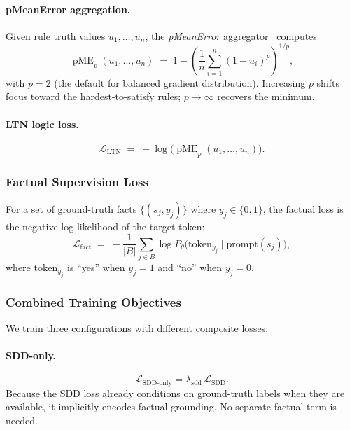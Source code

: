 \documentclass[11pt,a4paper]{article}
\newcommand{\pME}{\operatorname{pME}}
\newcommand{\SL}{\mathcal{L}_{\text{SDD}}}
\newcommand{\LTNloss}{\mathcal{L}_{\text{LTN}}}
\newcommand{\Lfact}{\mathcal{L}_{\text{fact}}}
\begin{document}
\paragraph{pMeanError aggregation.}
Given rule truth values $u_1, \dots, u_n$, the \emph{pMeanError}
aggregator~\cite{badreddine2022ltn} computes
\begin{equation}\label{eq:pme}
  \pME_p(u_1, \dots, u_n)
  \;=\; 1 - \left(
    \frac{1}{n}\sum_{i=1}^{n}(1 - u_i)^p
  \right)^{\!1/p}\!,
\end{equation}
with $p{=}2$ (the default for balanced gradient distribution).  Increasing
$p$ shifts focus toward the hardest-to-satisfy rules; $p{\to}\infty$
recovers the minimum.

\paragraph{LTN logic loss.}
\begin{equation}\label{eq:ltnloss}
  \LTNloss \;=\; -\log\!\bigl(\pME_p(u_1, \dots, u_n)\bigr).
\end{equation}

\subsubsection{Factual Supervision Loss}

For a set of ground-truth facts $\{(s_j, y_j)\}$ where $y_j \in \{0,1\}$,
the factual loss is the negative log-likelihood of the target token:
\begin{equation}\label{eq:factloss}
  \Lfact \;=\; -\frac{1}{|B|}\sum_{j \in B}
    \log P_\theta\!\bigl(
      \text{token}_{y_j} \mid \text{prompt}(s_j)
    \bigr),
\end{equation}
where $\text{token}_{y_j}$ is ``yes'' when $y_j{=}1$ and ``no'' when
$y_j{=}0$.

\subsubsection{Combined Training Objectives}

We train three configurations with different composite losses:

\paragraph{SDD-only.}
\begin{equation}\label{eq:loss-sdd}
  \mathcal{L}_{\text{SDD-only}}
  = \lambda_{\text{sdd}}\,\SL.
\end{equation}
Because the SDD loss already conditions on ground-truth labels when they
are available, it implicitly encodes factual grounding.  No separate
factual term is needed.
\end{document}
